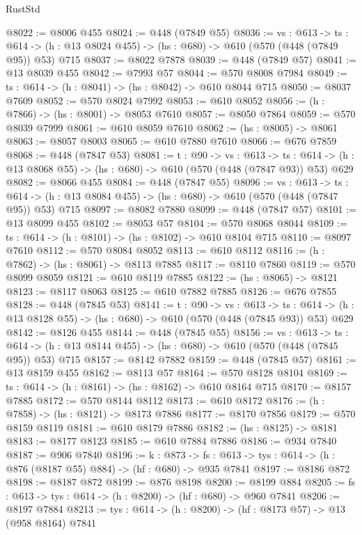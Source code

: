 \begin{lexlean}{RustStd}
\begin{coremodule}
@8022 := @8006 @455
@8024 := @448 (@7849 @55)
@8036 := {vs : @613} ->
  {ts : @614} -> (h : @13 @8024 @455) -> (hs : @680) -> @610 (@570 (@448 (@7849 @95)) @53) @715
@8037 := @8022 @7878
@8039 := @448 (@7849 @57)
@8041 := @13 @8039 @455
@8042 := @7993 @57
@8044 := @570 @8008 @7984
@8049 := {ts : @614} -> (h : @8041) -> (hs : @8042) -> @610 @8044 @715
@8050 := @8037 @7609
@8052 := @570 @8024 @7992
@8053 := @610 @8052
@8056 := (h : @7866) -> (hs : @8001) -> @8053 @7610
@8057 := @8050 @7864
@8059 := @570 @8039 @7999
@8061 := @610 @8059 @7610
@8062 := (hs : @8005) -> @8061
@8063 := @8057 @8003
@8065 := @610 @7880 @7610
@8066 := @676 @7859
@8068 := @448 (@7847 @53)
@8081 := {t : @90} ->
  {vs : @613} ->
  {ts : @614} -> (h : @13 @8068 @55) -> (hs : @680) -> @610 (@570 (@448 (@7847 @93)) @53) @629
@8082 := @8066 @455
@8084 := @448 (@7847 @55)
@8096 := {vs : @613} ->
  {ts : @614} -> (h : @13 @8084 @455) -> (hs : @680) -> @610 (@570 (@448 (@7847 @95)) @53) @715
@8097 := @8082 @7880
@8099 := @448 (@7847 @57)
@8101 := @13 @8099 @455
@8102 := @8053 @57
@8104 := @570 @8068 @8044
@8109 := {ts : @614} -> (h : @8101) -> (hs : @8102) -> @610 @8104 @715
@8110 := @8097 @7610
@8112 := @570 @8084 @8052
@8113 := @610 @8112
@8116 := (h : @7862) -> (hs : @8061) -> @8113 @7885
@8117 := @8110 @7860
@8119 := @570 @8099 @8059
@8121 := @610 @8119 @7885
@8122 := (hs : @8065) -> @8121
@8123 := @8117 @8063
@8125 := @610 @7882 @7885
@8126 := @676 @7855
@8128 := @448 (@7845 @53)
@8141 := {t : @90} ->
  {vs : @613} ->
  {ts : @614} -> (h : @13 @8128 @55) -> (hs : @680) -> @610 (@570 (@448 (@7845 @93)) @53) @629
@8142 := @8126 @455
@8144 := @448 (@7845 @55)
@8156 := {vs : @613} ->
  {ts : @614} -> (h : @13 @8144 @455) -> (hs : @680) -> @610 (@570 (@448 (@7845 @95)) @53) @715
@8157 := @8142 @7882
@8159 := @448 (@7845 @57)
@8161 := @13 @8159 @455
@8162 := @8113 @57
@8164 := @570 @8128 @8104
@8169 := {ts : @614} -> (h : @8161) -> (hs : @8162) -> @610 @8164 @715
@8170 := @8157 @7885
@8172 := @570 @8144 @8112
@8173 := @610 @8172
@8176 := (h : @7858) -> (hs : @8121) -> @8173 @7886
@8177 := @8170 @7856
@8179 := @570 @8159 @8119
@8181 := @610 @8179 @7886
@8182 := (hs : @8125) -> @8181
@8183 := @8177 @8123
@8185 := @610 @7884 @7886
@8186 := @934 @7840
@8187 := @906 @7840
@8196 := {k : @873} ->
  {fs : @613} -> {tys : @614} -> (h : @876 (@8187 @55) @884) -> (hf : @680) -> @935 @7841
@8197 := @8186 @872
@8198 := @8187 @872
@8199 := @876 @8198
@8200 := @8199 @884
@8205 := {fs : @613} -> {tys : @614} -> (h : @8200) -> (hf : @680) -> @960 @7841
@8206 := @8197 @7884
@8213 := {tys : @614} -> (h : @8200) -> (hf : @8173 @57) -> @13 (@958 @8164) @7841

\end{coremodule}
\end{lexlean}
